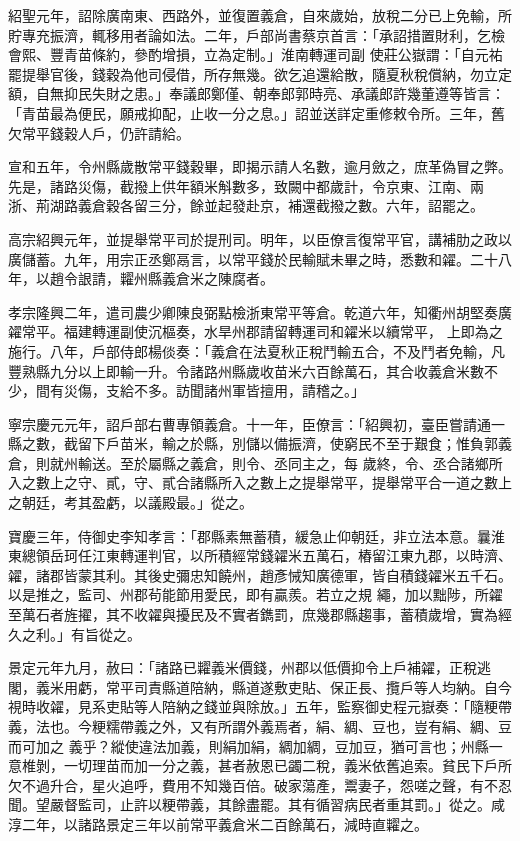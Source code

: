 \begin{pinyinscope}
 紹聖元年，詔除廣南東、西路外，並復置義倉，自來歲始，放稅二分已上免輸，所貯專充振濟，輒移用者論如法。二年，戶部尚書蔡京首言：「承詔措置財利，乞檢會熙、豐青苗條約，參酌增損，立為定制。」淮南轉運司副
 使莊公嶽謂：「自元祐罷提舉官後，錢穀為他司侵借，所存無幾。欲乞追還給散，隨夏秋稅償納，勿立定額，自無抑民失財之患。」奉議郎鄭僅、朝奉郎郭時亮、承議郎許幾董遵等皆言：「青苗最為便民，願戒抑配，止收一分之息。」詔並送詳定重修敕令所。三年，舊欠常平錢穀人戶，仍許請給。



 宣和五年，令州縣歲散常平錢穀畢，即揭示請人名數，逾月斂之，庶革偽冒之弊。先是，諸路災傷，截撥上供年額米斛數多，致闕中都歲計，令京東、江南、兩
 浙、荊湖路義倉穀各留三分，餘並起發赴京，補還截撥之數。六年，詔罷之。



 高宗紹興元年，並提舉常平司於提刑司。明年，以臣僚言復常平官，講補肋之政以廣儲蓄。九年，用宗正丞鄭鬲言，以常平錢於民輸賦未畢之時，悉數和糴。二十八年，以趙令詪請，糶州縣義倉米之陳腐者。



 孝宗隆興二年，遣司農少卿陳良弼點檢浙東常平等倉。乾道六年，知衢州胡堅奏廣糴常平。福建轉運副使沉樞奏，水旱州郡請留轉運司和糴米以續常平，
 上即為之施行。八年，戶部侍郎楊倓奏：「義倉在法夏秋正稅鬥輸五合，不及鬥者免輸，凡豐熟縣九分以上即輸一升。令諸路州縣歲收苗米六百餘萬石，其合收義倉米數不少，間有災傷，支給不多。訪聞諸州軍皆擅用，請稽之。」



 寧宗慶元元年，詔戶部右曹專領義倉。十一年，臣僚言：「紹興初，臺臣嘗請通一縣之數，截留下戶苗米，輸之於縣，別儲以備振濟，使窮民不至于艱食；惟負郭義倉，則就州輸送。至於屬縣之義倉，則令、丞同主之，每
 歲終，令、丞合諸鄉所入之數上之守、貳，守、貳合諸縣所入之數上之提舉常平，提舉常平合一道之數上之朝廷，考其盈虧，以議殿最。」從之。



 寶慶三年，侍御史李知孝言：「郡縣素無蓄積，緩急止仰朝廷，非立法本意。曩淮東總領岳珂任江東轉運判官，以所積經常錢糴米五萬石，樁留江東九郡，以時濟、糴，諸郡皆蒙其利。其後史彌忠知饒州，趙彥悈知廣德軍，皆自積錢糴米五千石。以是推之，監司、州郡茍能節用愛民，即有贏羨。若立之規
 繩，加以黜陟，所糴至萬石者旌擢，其不收糴與擾民及不實者鐫罰，庶幾郡縣趨事，蓄積歲增，實為經久之利。」有旨從之。



 景定元年九月，赦曰：「諸路已糶義米價錢，州郡以低價抑令上戶補糴，正稅逃閣，義米用虧，常平司責縣道陪納，縣道遂敷吏貼、保正長、攬戶等人均納。自今視時收糴，見系吏貼等人陪納之錢並與除放。」五年，監察御史程元嶽奏：「隨粳帶義，法也。今粳糯帶義之外，又有所謂外義焉者，絹、綢、豆也，豈有絹、綢、豆而可加之
 義乎？縱使違法加義，則絹加絹，綢加綢，豆加豆，猶可言也；州縣一意椎剝，一切理苗而加一分之義，甚者赦恩已蠲二稅，義米依舊追索。貧民下戶所欠不過升合，星火追呼，費用不知幾百倍。破家蕩產，鬻妻子，怨嗟之聲，有不忍聞。望嚴督監司，止許以粳帶義，其餘盡罷。其有循習病民者重其罰。」從之。咸淳二年，以諸路景定三年以前常平義倉米二百餘萬石，減時直糶之。



\end{pinyinscope}